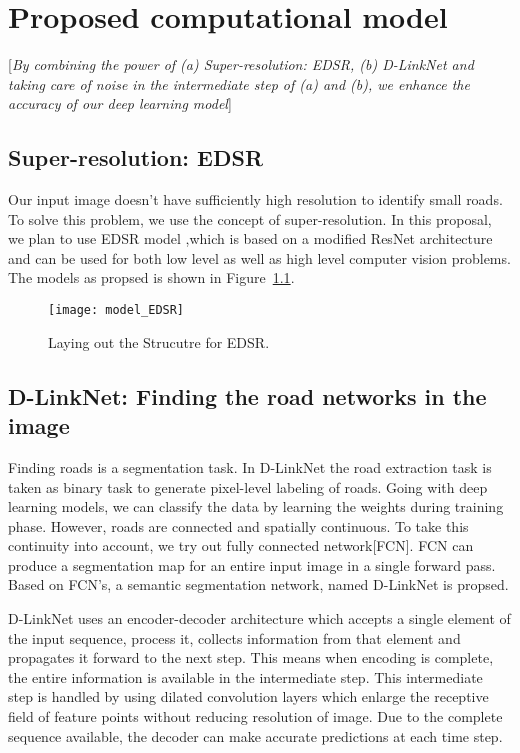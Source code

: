 \chapter{Proposed computational model}\label{chapt:model}
[\textit{By combining the power of (a) Super-resolution: EDSR, (b) D-LinkNet and taking care of noise in the intermediate step of (a) and (b), we enhance the accuracy of our deep learning model}]

\section{Super-resolution: EDSR}
Our input image doesn't have sufficiently high resolution to identify small roads. To solve this problem, we use the concept of super-resolution. In this proposal, we plan to use EDSR model %
,which is based on a modified ResNet architecture and can be used for both low level as well as high level computer vision problems. The models as propsed\cite{EDSR} is shown in Figure~\ref{fig:model_EDSR}. \par

\begin{figure}[h!]
  \centering
  \texttt{[image: model\_EDSR]}
  \caption{Laying out the Strucutre for EDSR\cite{EDSR}.}
  \label{fig:model_EDSR}
\end{figure}

\section{D-LinkNet: Finding the road networks in the image}
Finding roads is a segmentation task. In D-LinkNet the road extraction task is taken as binary task to generate pixel-level labeling of roads. Going with deep learning models, we can classify the data by learning the weights during training phase. However, roads are connected and spatially continuous. To take this continuity into account, we try out fully connected network[FCN]. FCN can produce a segmentation map for an entire input image in a single forward pass. Based on FCN's, a semantic segmentation network, named D-LinkNet is propsed\cite{D-LinkNet}. \par

D-LinkNet uses an encoder-decoder architecture which accepts a single element of the input sequence, process it, collects information from that element and propagates it forward to the next step. This means when encoding is complete, the entire information is available in the intermediate step. This intermediate step is handled by using dilated convolution layers which enlarge the receptive field of feature points without reducing resolution of image. Due to the complete sequence available, the decoder can make accurate predictions at each time step. \par

